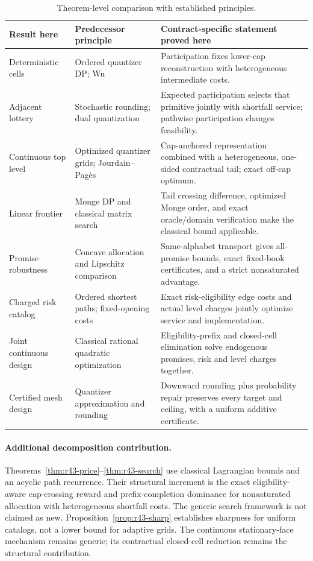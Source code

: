 \begin{table}[p]\centering
\caption{Theorem-level comparison with established principles.}\label{tab:r37-priority}
\small\begin{tabular}{p{}p{}p{}}\toprule
Result here & Predecessor principle & Contract-specific statement proved here\\\midrule
Deterministic cells & Ordered quantizer DP; Wu & Participation fixes lower-cap reconstruction with heterogeneous intermediate costs.\\[3pt]
Adjacent lottery & Stochastic rounding; dual quantization & Expected participation selects that primitive jointly with shortfall service; pathwise participation changes feasibility.\\[3pt]
Continuous top level & Optimized quantizer grids; Jourdain--Pag\`es & Cap-anchored representation combined with a heterogeneous, one-sided contractual tail; exact off-cap optimum.\\[3pt]
Linear frontier & Monge DP and classical matrix search & Tail crossing difference, optimized Monge order, and exact oracle/domain verification make the classical bound applicable.\\[3pt]
Promise robustness & Concave allocation and Lipschitz comparison & Same-alphabet transport gives all-promise bounds, exact fixed-book certificates, and a strict nonsaturated advantage.\\[3pt]
Charged risk catalog & Ordered shortest paths; fixed-opening costs & Exact risk-eligibility edge costs and actual level charges jointly optimize service and implementation.\\[3pt]
Joint continuous design & Classical rational quadratic optimization & Eligibility-prefix and closed-cell elimination solve endogenous promises, risk and level charges together.\\[3pt]
Certified mesh design & Quantizer approximation and rounding & Downward rounding plus probability repair preserves every target and ceiling, with a uniform additive certificate.\\\bottomrule
\end{tabular}
\end{table}

\paragraph{Additional decomposition contribution.}
Theorems~\ref{thm:r43-price}--\ref{thm:r43-search} use classical Lagrangian bounds and an acyclic path recurrence. Their structural increment is the exact eligibility-aware cap-crossing reward and prefix-completion dominance for nonsaturated allocation with heterogeneous shortfall costs. The generic search framework is not claimed as new. Proposition~\ref{prop:r43-sharp} establishes sharpness for uniform catalogs, not a lower bound for adaptive grids. The continuous stationary-face mechanism remains generic; its contractual closed-cell reduction remains the structural contribution.
